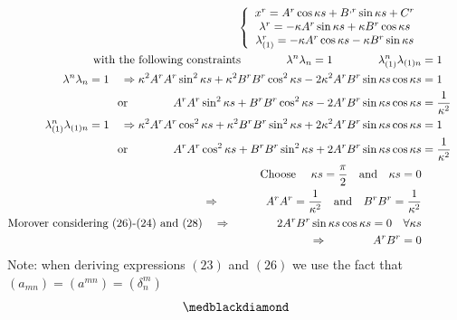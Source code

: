 \begin{align}
\left \{ \begin{array}{c}
x^r = A^{r}\cos \kappa s   + B^{,r}\sin \kappa s + C^r\\
\lambda^r =  -\kappa A^{r}\sin \kappa s  +\kappa B^{r}\cos \kappa s\\
\lambda_{(1)}^r = - \kappa A^{r}\cos \kappa s  - \kappa B^{r}\sin \kappa s\\
\end{array} \right.\\
\text{with the following constraints}\quad\quad\quad\quad \lambda^n\lambda_n = 1\quad\quad\quad\quad 
\lambda_{(1)}^n\lambda_{(1)n} &= 1\\
\lambda^n\lambda_n = 1\quad\Rightarrow \kappa^2 A^r A^r \sin ^2 \kappa s+ \kappa^2 B^r B^r \cos ^2 \kappa s - 2 \kappa^2 A^rB^r\sin\kappa s\cos \kappa s &= 1\\
\text{or} \quad\quad\quad\quad A^r A^r \sin ^2 \kappa s+  B^r B^r \cos ^2 \kappa s - 2 A^rB^r\sin\kappa s\cos \kappa s &= \frac{1}{\kappa^2 }\\
\lambda_{(1)}^n\lambda_{(1)n} = 1\quad\Rightarrow \kappa^2 A^r A^r \cos ^2 \kappa s+ \kappa^2 B^r B^r \sin ^2 \kappa s + 2 \kappa^2 A^rB^r\sin\kappa s\cos \kappa s &= 1\\
\text{or} \quad\quad\quad\quad A^r A^r \cos ^2 \kappa s+  B^r B^r \sin ^2 \kappa s + 2 A^rB^r\sin\kappa s\cos \kappa s &= \frac{1}{\kappa^2 }\\
\text{Choose }\quad \kappa s = \frac{\pi}{2}\quad\text{and} \quad \kappa s = 0\\
\Rightarrow \quad\quad\quad\quad A^r A^r =  \frac{1}{\kappa^2 }\quad\text{and}\quad B^r B^r =  \frac{1}{\kappa^2 }\\
\text{Morover considering (26)-(24) and (28)}\quad \Rightarrow \quad\quad\quad\quad 2A^rB^r\sin \kappa s \cos \kappa s =0 \quad \forall \kappa s\\
\Rightarrow \quad\quad\quad\quad A^rB^r=0
\end{align}
Note: when deriving expressions $(23)$ and $(26)$ we use the fact that $\left(a_{mn}\right) =  \left(a^{mn}\right) = \left(\delta^m_n\right) $
$$\medblackdiamond$$
\newpage

